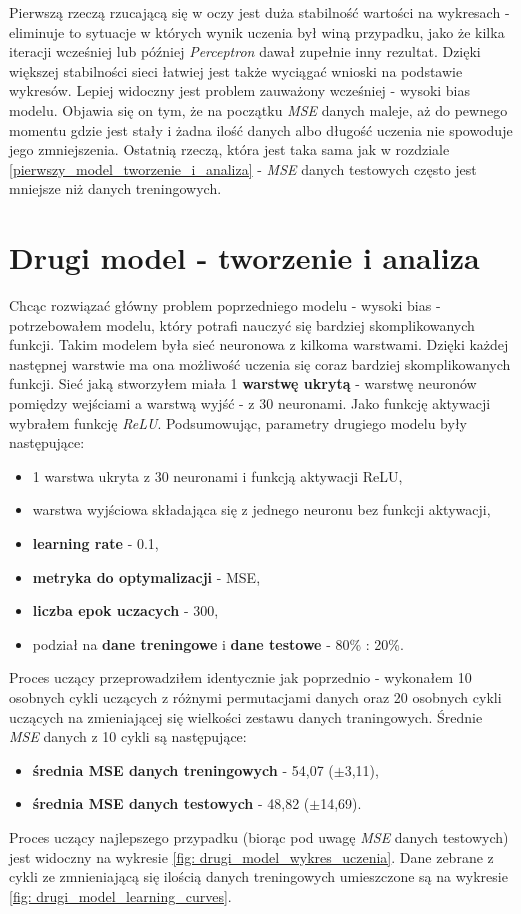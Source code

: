 \documentclass[12pt]{aghdpl}
\begin{document}
		Pierwszą rzeczą rzucającą się w oczy jest duża stabilność wartości na wykresach - eliminuje to sytuacje w których wynik uczenia był winą przypadku, jako że kilka iteracji wcześniej lub później \textit{Perceptron} dawał zupełnie inny rezultat. Dzięki większej stabilności sieci łatwiej jest także wyciągać wnioski na podstawie wykresów. Lepiej widoczny jest problem zauważony wcześniej - wysoki bias modelu. Objawia się on tym, że na początku \textit{MSE} danych maleje, aż do pewnego momentu gdzie jest stały i żadna ilość danych albo długość uczenia nie spowoduje jego zmniejszenia. Ostatnią rzeczą, która jest taka sama jak w rozdziale \ref{pierwszy_model_tworzenie_i_analiza} - \textit{MSE} danych testowych często jest mniejsze niż danych treningowych.
		
		\section{Drugi model - tworzenie i analiza} \label{drugi_model_tworzenie_i_analiza}
		Chcąc rozwiązać główny problem poprzedniego modelu - wysoki bias - potrzebowałem modelu, który potrafi nauczyć się bardziej skomplikowanych funkcji. Takim modelem była sieć neuronowa z kilkoma warstwami. Dzięki każdej następnej warstwie ma ona możliwość uczenia się coraz bardziej skomplikowanych funkcji. Sieć jaką stworzyłem miała 1 \textbf{warstwę ukrytą} - warstwę neuronów pomiędzy wejściami a warstwą wyjść - z 30 neuronami. Jako funkcję aktywacji wybrałem funkcję \textit{ReLU}.
		Podsumowując, parametry drugiego modelu były następujące:
		\begin{itemize}
			\item 1 warstwa ukryta z 30 neuronami i funkcją aktywacji ReLU,
			\item warstwa wyjściowa składająca się z jednego neuronu bez funkcji aktywacji,
			\item \textbf{learning rate} - 0.1,
			\item \textbf{metryka do optymalizacji} - MSE,
			\item \textbf{liczba epok uczacych} - 300,
			\item podział na \textbf{dane treningowe} i \textbf{dane testowe} - 80\% : 20\%.
		\end{itemize}
		
		Proces uczący przeprowadziłem identycznie jak poprzednio - wykonałem 10 osobnych cykli uczących z różnymi permutacjami danych oraz 20 osobnych cykli uczących na zmieniającej się wielkości zestawu danych traningowych. Średnie \textit{MSE} danych z 10 cykli są następujące:
		\begin{itemize}
		\item \textbf{średnia MSE danych treningowych} - 54,07 ($\pm$3,11),
		\item \textbf{średnia MSE danych testowych} - 48,82 ($\pm$14,69).
		\end{itemize}
		Proces uczący najlepszego przypadku (biorąc pod uwagę \textit{MSE} danych testowych) jest widoczny na wykresie \ref{fig: drugi_model_wykres_uczenia}. Dane zebrane z cykli ze zmnieniającą się ilością danych treningowych umieszczone są na wykresie \ref{fig: drugi_model_learning_curves}.
		
\end{document}
